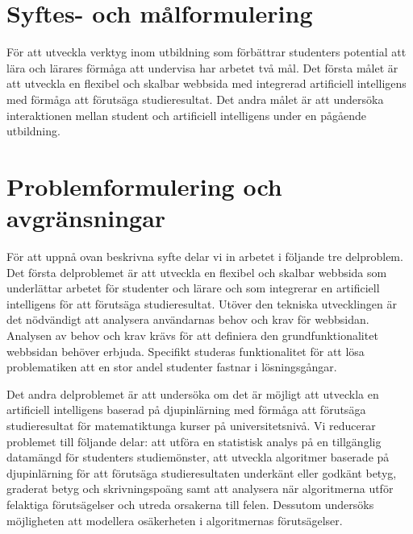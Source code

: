 
\section{Syftes- och målformulering}
\label{sec:purpose_and_problem}
För att utveckla verktyg inom utbildning som förbättrar studenters potential att lära och lärares förmåga att undervisa har arbetet två mål. Det första målet är att utveckla en flexibel och skalbar webbsida med integrerad artificiell intelligens med förmåga att förutsäga studieresultat. Det andra målet är att undersöka interaktionen mellan student och artificiell intelligens under en pågående utbildning.

\section{Problemformulering och avgränsningar}
För att uppnå ovan beskrivna syfte delar vi in arbetet i följande tre delproblem. Det första delproblemet är att utveckla en flexibel och skalbar webbsida som underlättar arbetet för studenter och lärare och som integrerar en artificiell intelligens för att förutsäga studieresultat. Utöver den tekniska utvecklingen är det nödvändigt att analysera användarnas behov och krav för webbsidan. Analysen av behov och krav krävs för att definiera den grundfunktionalitet webbsidan behöver erbjuda. Specifikt studeras funktionalitet för att lösa problematiken att en stor andel studenter fastnar i lösningsgångar.

Det andra delproblemet är att undersöka om det är möjligt att utveckla en artificiell intelligens baserad på djupinlärning med förmåga att förutsäga studieresultat för matematiktunga kurser på universitetsnivå. Vi reducerar problemet till följande delar: att utföra en statistisk analys på en tillgänglig datamängd för studenters studiemönster, att utveckla algoritmer baserade på djupinlärning för att förutsäga studieresultaten underkänt eller godkänt betyg, graderat betyg och skrivningspoäng samt att analysera när algoritmerna utför felaktiga förutsägelser och utreda orsakerna till felen. Dessutom undersöks möjligheten att modellera osäkerheten i algoritmernas förutsägelser. 

